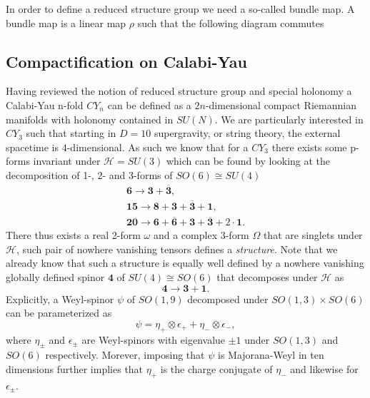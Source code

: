 In order to define a reduced structure group we need a so-called bundle map. A bundle map is a linear map $\rho$ such that the following diagram commutes
\begin{center}
\end{center}



\subsection{Compactification on Calabi-Yau}
Having reviewed the notion of reduced structure group and special holonomy a Calabi-Yau n-fold $CY_{n}$ can be defined as a $2n$-dimensional compact Riemannian manifolds with holonomy contained in $SU(N)$\cite{Blumenhagen2013}. We are particularly interested in $CY_3$ such that starting in $D=10$ supergravity, or string theory, the external spacetime is 4-dimensional. As such we know that for a $CY_3$ there exists some p-forms invariant under $\mathscr{H}=SU(3)$ which can be found by looking at the decomposition of 1-, 2- and 3-forms of $SO(6)\cong SU(4)$
\begin{align*}
    \mathbf{6}\to \mathbf{3}+\mathbf{\overbar{3}},\\
    \mathbf{15}\to \mathbf{8}+\mathbf{3}+\overbar{\mathbf{3}}+\mathbf{1},\\
    \mathbf{20}\to \mathbf{6}+\overbar{\mathbf{6}}+\mathbf{3}+\overbar{\mathbf{3}}+2\cdot\mathbf{1}.
\end{align*}
There thus exists a real 2-form $\omega$ and a complex 3-form $\Omega$ that are singlets under $\mathscr{H}$, such pair of nowhere vanishing tensors defines a \emph{structure}. Note that we already know that such a structure is equally well defined by a nowhere vanishing globally defined spinor $\mathbf{4}$ of $SU(4)\cong SO(6)$ that decomposes under $\mathscr{H}$ as 
\begin{equation}
    \mathbf{4}\to \mathbf{3}+\mathbf{1}.
\end{equation}
Explicitly, a Weyl-spinor $\psi$ of $SO(1,9)$ decomposed under $SO(1,3)\times SO(6)$ can be parameterized as 
\begin{equation}
    \psi = \eta_+\otimes\epsilon_++\eta_-\otimes\epsilon_-,
\end{equation}
where $\eta_\pm$ and $\epsilon_\pm$ are Weyl-spinors with eigenvalue $\pm 1$ under $SO(1,3)$ and $SO(6)$ respectively. Morever, imposing that $\psi$ is Majorana-Weyl in ten dimensions further implies that $\eta_+$ is the charge conjugate of $\eta_-$ and likewise for $\epsilon_\pm$.

